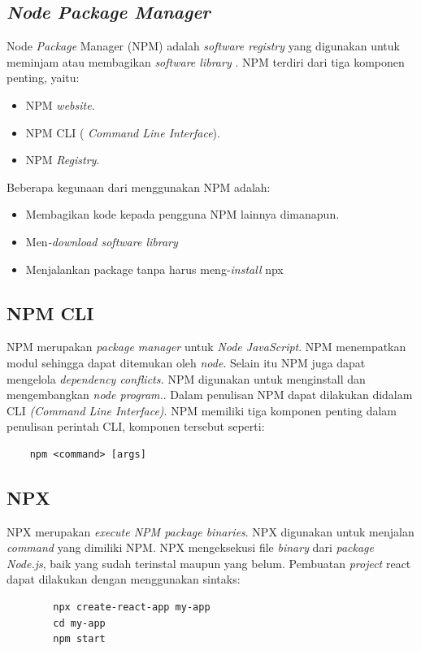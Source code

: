 

\subsection{\textit{Node Package Manager}}
Node \textit{Package} Manager (NPM) adalah \textit{software registry} yang digunakan untuk meminjam atau membagikan \textit{software library} \cite{npmAbout}. NPM terdiri dari tiga komponen penting, yaitu:
\begin{itemize}
    \item NPM \textit{website}.
    \item NPM CLI ( \textit{Command Line Interface}). 
    \item NPM \textit{Registry}.
\end{itemize}

Beberapa kegunaan dari menggunakan NPM adalah:
\begin{itemize}
    \item Membagikan kode kepada pengguna NPM lainnya dimanapun.
    \item Men\textit{-download software library}
    \item Menjalankan pack\textit{}age tanpa harus meng-\textit{install} npx
\end{itemize}

\subsection{NPM CLI}
NPM merupakan \textit{package manager} untuk \textit{Node JavaScript}. NPM menempatkan modul sehingga dapat ditemukan oleh \textit{node}. Selain itu NPM juga dapat mengelola \textit{dependency conflicts.} NPM digunakan untuk menginstall dan mengembangkan \textit{node program.}. Dalam penulisan NPM dapat dilakukan didalam CLI \textit{(Command Line Interface)}. NPM memiliki tiga komponen penting dalam penulisan perintah CLI, komponen tersebut seperti:
\begin{verbatim}
    npm <command> [args]
\end{verbatim}

\subsection{NPX}
NPX merupakan \textit{execute NPM package binaries}. NPX digunakan untuk menjalan \textit{command} yang dimiliki NPM. NPX mengeksekusi file \textit{binary} dari \textit{package} \textit{Node.js}, baik yang sudah terinstal maupun yang belum. Pembuatan \textit{project} react dapat dilakukan dengan menggunakan sintaks:
    \begin{verbatim}
        npx create-react-app my-app
        cd my-app
        npm start
    \end{verbatim}

